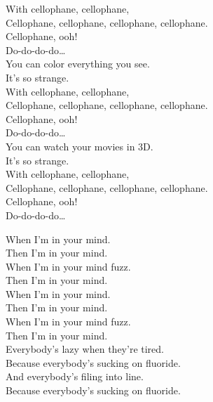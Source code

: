 With cellophane, cellophane, \\
Cellophane, cellophane, cellophane, cellophane. \\
Cellophane, ooh! \\
Do-do-do-do… \\

You can color everything you see. \\
It's so strange. \\

With cellophane, cellophane, \\
Cellophane, cellophane, cellophane, cellophane. \\
Cellophane, ooh! \\
Do-do-do-do… \\

You can watch your movies in 3D. \\
It's so strange. \\

With cellophane, cellophane, \\
Cellophane, cellophane, cellophane, cellophane. \\
Cellophane, ooh! \\
Do-do-do-do… \\





When I'm in your mind. \\
Then I'm in your mind. \\
When I'm in your mind fuzz. \\
Then I'm in your mind. \\

When I'm in your mind. \\
Then I'm in your mind. \\
When I'm in your mind fuzz. \\
Then I'm in your mind. \\

Everybody's lazy when they're tired. \\
Because everybody's sucking on fluoride. \\
And everybody's filing into line. \\
Because everybody's sucking on fluoride. \\

